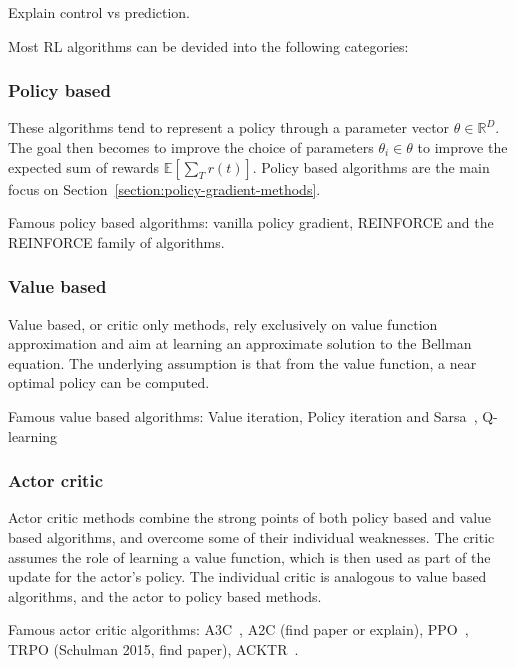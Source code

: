 \documentclass{../main.tex}{subfiles}
\begin{document}

Explain control vs prediction.

Most RL algorithms can be devided into the following categories:
\subsubsection{Policy based}
These algorithms tend to represent a policy through a parameter vector $\theta
\in \mathbb{R}^D$. The goal then becomes to improve the choice of parameters
$\theta_i \in \theta$ to improve the expected sum of rewards
$\mathbb{E}[\sum_{T} r(t)]$. Policy based algorithms are the main focus on Section~\ref{section:policy-gradient-methods}.

Famous policy based algorithms: vanilla policy gradient, REINFORCE\citep{Williams1992} and the REINFORCE family of algorithms\@.

\subsubsection{Value based}
Value based, or critic only methods, rely exclusively on value function approximation and aim at learning an approximate solution to the Bellman equation. The underlying assumption is that from the value function, a near optimal policy can be computed.

Famous value based algorithms: Value iteration, Policy iteration and Sarsa~\cite{Sutton1998}, Q-learning~\citep{Watkins1989}

\subsubsection{Actor critic}

Actor critic methods combine the strong points of both policy based and value based algorithms, and overcome some of their individual weaknesses. The critic assumes the role of learning a value function, which is then used as part of the update for the actor's policy. The individual critic is analogous to value based algorithms, and the actor to policy based methods.

Famous actor critic algorithms: A3C~\citep{Mnih2016}, A2C (find paper or explain), PPO~\citep{Schulman2017}, TRPO (Schulman 2015, find paper), ACKTR~\citep{Wu2017}.
\end{document}
